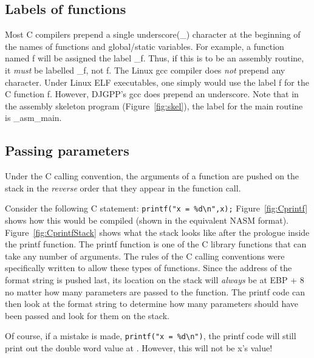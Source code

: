 \subsection{Labels of functions}
Most C compilers prepend a single underscore({\code \_}) character at
the beginning of the names of functions and global/static
variables. For example, a function named {\code f} will be assigned
the label {\code \_f}. Thus, if this is to be an assembly routine, it
\emph{must} be labelled {\code \_f}, not {\code f}. The Linux gcc
compiler does \emph{not} prepend any character.  Under Linux ELF
executables, one simply would use the label {\code f} for the C
function {\code f}.  However, DJGPP's gcc does prepend an
underscore. Note that in the assembly skeleton program
(Figure~\ref{fig:skel}), the label for the main routine is {\code
\_asm\_main}.

\subsection{Passing parameters}
Under the C calling convention, the arguments of a function are pushed on
the stack in the \emph{reverse} order that they appear in the function
call.

Consider the following C statement: \verb|printf("x = %d\n",x);|
Figure~\ref{fig:Cprintf} shows how this would be compiled (shown in
the equivalent NASM format). Figure~\ref{fig:CprintfStack} shows what
the stack looks like after the prologue inside the {\code printf}
function. The {\code printf} function is one of the C library
functions that can take any number of arguments. The rules of the C
calling conventions were specifically written to allow these types of
functions.  Since the address of the format string is
pushed last, its location on the stack will \emph{always} be at
{\code EBP + 8} no matter how many parameters are passed to the
function. The {\code printf} code can then look at the format string
to determine how many parameters should have been passed and look for
them on the stack.

Of course, if a mistake is made, \verb|printf("x = %d\n")|, the
{\code printf} code will still print out the double word value at 
{\code [EBP + 12]}. However, this will not be {\code x}'s value!


